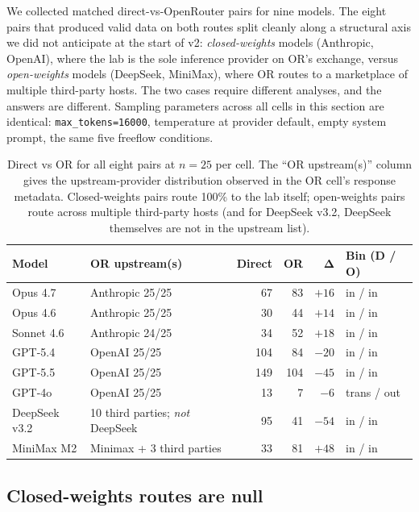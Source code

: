 \documentclass[11pt,a4paper]{article}
\begin{document}
We collected matched direct-vs-OpenRouter pairs for nine models. The eight pairs that produced valid data on both routes split cleanly along a structural axis we did not anticipate at the start of v2: \emph{closed-weights} models (Anthropic, OpenAI), where the lab is the sole inference provider on OR's exchange, versus \emph{open-weights} models (DeepSeek, MiniMax), where OR routes to a marketplace of multiple third-party hosts. The two cases require different analyses, and the answers are different. Sampling parameters across all cells in this section are identical: \texttt{max\_tokens=16000}, temperature at provider default, empty system prompt, the same five freeflow conditions.

\begin{table}[h]
\centering
\caption{Direct vs OR for all eight pairs at $n{=}25$ per cell. The ``OR upstream(s)'' column gives the upstream-provider distribution observed in the OR cell's response metadata. Closed-weights pairs route 100\% to the lab itself; open-weights pairs route across multiple third-party hosts (and for DeepSeek v3.2, DeepSeek themselves are not in the upstream list).}
\label{tab:routing-first-round}
\small
\begin{tabular}{llrrrl}
\toprule
\textbf{Model} & \textbf{OR upstream(s)} & \textbf{Direct} & \textbf{OR} & $\boldsymbol{\Delta}$ & \textbf{Bin (D / O)} \\
\midrule
Opus 4.7 & Anthropic 25/25 & 67 & 83 & $+16$ & in / in \\
Opus 4.6 & Anthropic 25/25 & 30 & 44 & $+14$ & in / in \\
Sonnet 4.6 & Anthropic 24/25 & 34 & 52 & $+18$ & in / in \\
GPT-5.4 & OpenAI 25/25 & 104 & 84 & $-20$ & in / in \\
GPT-5.5 & OpenAI 25/25 & 149 & 104 & $-45$ & in / in \\
GPT-4o & OpenAI 25/25 & 13 & 7 & $-6$ & trans / out \\
\midrule
DeepSeek v3.2 & 10 third parties; \emph{not} DeepSeek & 95 & 41 & $-54$ & in / in \\
MiniMax M2 & Minimax + 3 third parties & 33 & 81 & $+48$ & in / in \\
\bottomrule
\end{tabular}
\end{table}

\subsection{Closed-weights routes are null}
\label{sec:routing-closed}
\end{document}
